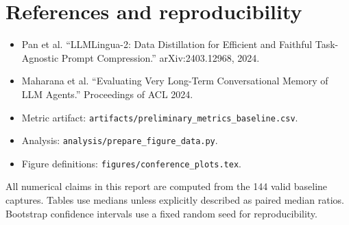 \documentclass[10pt]{article}
\begin{document}
\section{References and reproducibility}

\begin{itemize}
  \item Pan et al. ``LLMLingua-2: Data Distillation for Efficient and Faithful
        Task-Agnostic Prompt Compression.'' arXiv:2403.12968, 2024.
  \item Maharana et al. ``Evaluating Very Long-Term Conversational Memory of
        LLM Agents.'' Proceedings of ACL 2024.
  \item Metric artifact:
        \texttt{artifacts/preliminary\_metrics\_baseline.csv}.
  \item Analysis:
        \texttt{analysis/prepare\_figure\_data.py}.
  \item Figure definitions:
        \texttt{figures/conference\_plots.tex}.
\end{itemize}

All numerical claims in this report are computed from the 144 valid baseline
captures. Tables use medians unless explicitly described as paired median
ratios. Bootstrap confidence intervals use a fixed random seed for
reproducibility.
\end{document}
